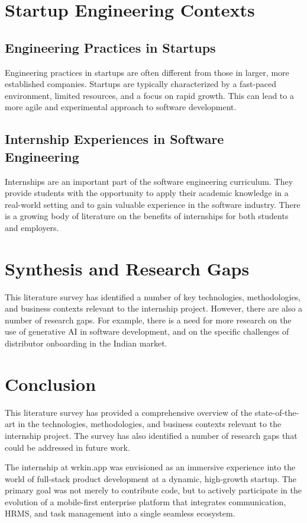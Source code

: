 \section{Startup Engineering Contexts}

\subsection{Engineering Practices in Startups}
Engineering practices in startups are often different from those in larger, more established companies. Startups are typically characterized by a fast-paced environment, limited resources, and a focus on rapid growth. This can lead to a more agile and experimental approach to software development.

\subsection{Internship Experiences in Software Engineering}
Internships are an important part of the software engineering curriculum. They provide students with the opportunity to apply their academic knowledge in a real-world setting and to gain valuable experience in the software industry. There is a growing body of literature on the benefits of internships for both students and employers.

\section{Synthesis and Research Gaps}
This literature survey has identified a number of key technologies, methodologies, and business contexts relevant to the internship project. However, there are also a number of research gaps. For example, there is a need for more research on the use of generative AI in software development, and on the specific challenges of distributor onboarding in the Indian market.

\section{Conclusion}
This literature survey has provided a comprehensive overview of the state-of-the-art in the technologies, methodologies, and business contexts relevant to the internship project. The survey has also identified a number of research gaps that could be addressed in future work.

The internship at wrkin.app was envisioned as an immersive experience into the world of full-stack product development at a dynamic, high-growth startup. The primary goal was not merely to contribute code, but to actively participate in the evolution of a mobile-first enterprise platform that integrates communication, HRMS, and task management into a single seamless ecosystem.

